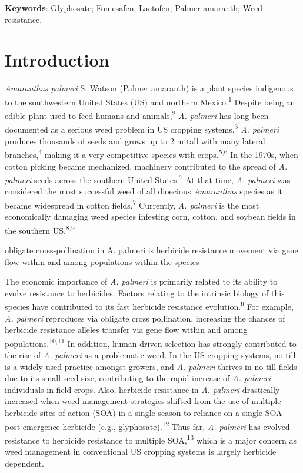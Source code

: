 \documentclass[
  12pt,
  a4paper]{article}
\begin{document}
\vspace{2mm}

\noindent \textbf{Keywords}: Glyphosate; Fomesafen; Lactofen; Palmer
amaranth; Weed resistance.

\linenumbers

\hypertarget{introduction}{%
\section{Introduction}\label{introduction}}

\emph{Amaranthus palmeri} S. Watson (Palmer amaranth) is a plant species
indigenous to the southwestern United States (US) and northern
Mexico.\textsuperscript{1} Despite being an edible plant used to feed
humans and animals,\textsuperscript{2} \emph{A. palmeri} has long been
documented as a serious weed problem in US cropping
systems.\textsuperscript{3} \emph{A. palmeri} produces thousands of
seeds and grows up to 2 m tall with many lateral
branches,\textsuperscript{4} making it a very competitive species with
crops.\textsuperscript{5,6} In the 1970s, when cotton picking became
mechanized, machinery contributed to the spread of \emph{A. palmeri}
seeds across the southern United States.\textsuperscript{7} At that
time, \emph{A. palmeri} was considered the most successful weed of all
dioecious \emph{Amaranthus} species as it became widespread in cotton
fields.\textsuperscript{7} Currently, \emph{A. palmeri} is the most
economically damaging weed species infesting corn, cotton, and soybean
fields in the southern US.\textsuperscript{8,9}

obligate cross-pollination in A. palmeri is herbicide resistance
movement via gene flow within and among populations within the species

The economic importance of \emph{A. palmeri} is primarily related to its
ability to evolve resistance to herbicides. Factors relating to the
intrinsic biology of this species have contributed to its fast herbicide
resistance evolution.\textsuperscript{9} For example, \emph{A. palmeri}
reproduces via obligate cross pollination, increasing the chances of
herbicide resistance alleles transfer via gene flow within and among
populations.\textsuperscript{10,11} In addition, human-driven selection
has strongly contributed to the rise of \emph{A. palmeri} as a
problematic weed. In the US cropping systems, no-till is a widely used
practice amongst growers, and \emph{A. palmeri} thrives in no-till
fields due to its small seed size, contributing to the rapid increase of
\emph{A. palmeri} individuals in field crops. Also, herbicide resistance
in \emph{A. palmeri} drastically increased when weed management
strategies shifted from the use of multiple herbicide sites of action
(SOA) in a single season to reliance on a single SOA post-emergence
herbicide (e.g., glyphosate).\textsuperscript{12} Thus far, \emph{A.
palmeri} has evolved resistance to herbicide resistance to multiple
SOA,\textsuperscript{13} which is a major concern as weed management in
conventional US cropping systems is largely herbicide dependent.
\end{document}
